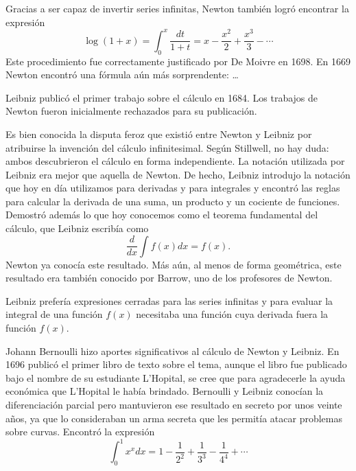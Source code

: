 Gracias a ser capaz de invertir series infinitas, Newton también logró encontrar la expresión
\[
	\log(1+x)=\int_0^x\dfrac{dt}{1+t}=x-\frac{x^2}{2}+\frac{x^3}{3}-\cdots
\]
Este procedimiento fue correctamente justificado por De Moivre en 1698.  
En 1669 Newton encontró una fórmula aún más sorprendente:
\dots

Leibniz publicó el primer trabajo sobre el cálculo en 1684. 
Los trabajos de Newton fueron inicialmente rechazados para su publicación. 

Es bien conocida la disputa feroz que existió entre Newton y Leibniz por atribuirse 
la invención del cálculo infinitesimal. 
Según Stillwell, no hay duda: ambos descubrieron el cálculo en forma
independiente. La notación utilizada por Leibniz era mejor que aquella de
Newton. De hecho, Leibniz introdujo la notación que hoy en día
utilizamos para derivadas y para integrales y encontró las reglas para calcular
la derivada de una suma, un producto y un cociente de funciones. Demostró
además lo que hoy conocemos como el teorema fundamental del cálculo, que
Leibniz escribía como
\[
	\frac{d}{dx}\int f(x)dx=f(x).
\]
Newton ya conocía este resultado. Más aún, al menos de forma geométrica, este resultado era también
conocido por Barrow, uno de los profesores de Newton. 

Leibniz prefería expresiones cerradas para las series infinitas y para evaluar la integral 
de una función $f(x)$ necesitaba una función cuya derivada fuera la función $f(x)$. 

Johann Bernoulli hizo aportes significativos al cálculo de Newton y Leibniz. En 1696 publicó el primer libro de texto sobre el tema, aunque 
el libro fue publicado bajo el nombre de su estudiante L'Hopital, se cree que 
para agradecerle la ayuda económica que L'Hopital le había brindado. Bernoulli y Leibniz conocían la diferenciación parcial pero
mantuvieron ese resultado en secreto por unos veinte años, ya que lo consideraban un arma secreta que les permitía atacar problemas sobre curvas. 
Encontró la expresión
\[
	\int_0^1 x^xdx=1-\frac{1}{2^2}+\frac{1}{3^3}-\frac{1}{4^4}+\cdots
\]

